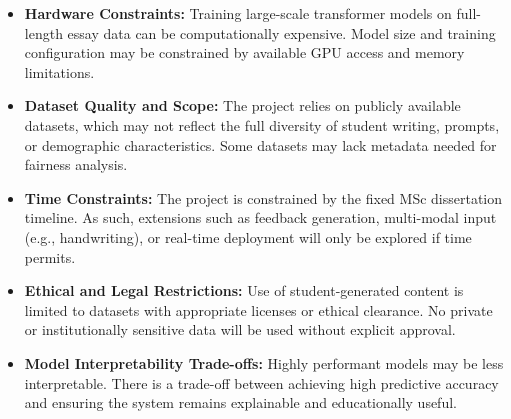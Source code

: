 \documentclass[11pt]{article}
\begin{document}
\begin{itemize}
    \item \textbf{Hardware Constraints:} Training large-scale transformer models on full-length essay data can be computationally expensive. Model size and training configuration may be constrained 
    by available GPU access and memory limitations.
    \item \textbf{Dataset Quality and Scope:} The project relies on publicly available datasets, which may not reflect the full diversity of student writing, prompts, or demographic characteristics. 
    Some datasets may lack metadata needed for fairness analysis.
    \item \textbf{Time Constraints:} The project is constrained by the fixed MSc dissertation timeline. As such, extensions such as feedback generation, multi-modal input (e.g., handwriting), 
    or real-time deployment will only be explored if time permits.
    \item \textbf{Ethical and Legal Restrictions:} Use of student-generated content is limited to datasets with appropriate licenses or ethical clearance. No private or institutionally sensitive data 
    will be used without explicit approval.
    \item \textbf{Model Interpretability Trade-offs:} Highly performant models may be less interpretable. There is a trade-off between achieving high predictive accuracy 
    and ensuring the system remains explainable and educationally useful.
\end{itemize}
\end{document}
